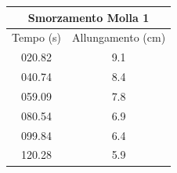 \documentclass[a4paper]{article}
\begin{document}
\newpage
{}
\begin{table}[!h]
    \centering
    \begin{tabular}{|c|c|}
    \hline
    \multicolumn{2}{|c|}{Smorzamento Molla 1} \\
    \hline
    Tempo (s) & Allungamento (cm)\\
    \hline
        020.82 & 9.1 \\
        040.74 & 8.4 \\
        059.09 & 7.8 \\
        080.54 & 6.9 \\
        099.84 & 6.4 \\
        120.28 & 5.9 \\
    \hline
    \end{tabular}
\end{table}
\end{document}
